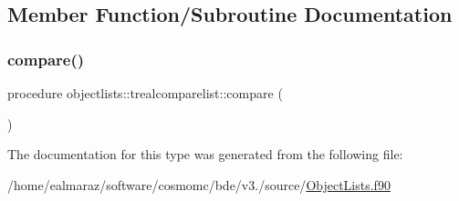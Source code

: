 \subsection{Member Function/\+Subroutine Documentation}
\mbox{\label{structobjectlists_1_1trealcomparelist_aabec69c557b4a6cfddee7575044bce97}} 
\subsubsection{\texorpdfstring{compare()}{compare()}}
{\footnotesize\ttfamily procedure objectlists\+::trealcomparelist\+::compare (\begin{DoxyParamCaption}{ }\end{DoxyParamCaption})\hspace{0.3cm}{\ttfamily [private]}}



The documentation for this type was generated from the following file\+:\begin{DoxyCompactItemize}
\item 
/home/ealmaraz/software/cosmomc/bde/v3./source/\mbox{\hyperlink{ObjectLists_8f90}{Object\+Lists.\+f90}}\end{DoxyCompactItemize}

